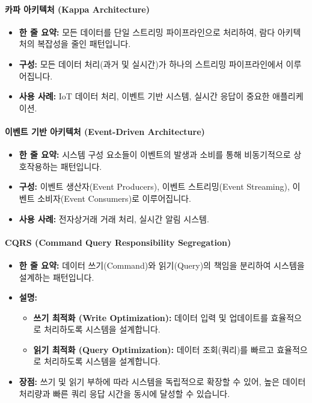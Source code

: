 \documentclass[11pt,a4paper]{article}
\theoremstyle{definition}
\begin{document}
\paragraph{카파 아키텍처 (Kappa Architecture)}
\begin{itemize}
    \item \textbf{한 줄 요약:} 모든 데이터를 단일 스트리밍 파이프라인으로 처리하여, 람다 아키텍처의 복잡성을 줄인 패턴입니다.
    \item \textbf{구성:} 모든 데이터 처리(과거 및 실시간)가 하나의 스트리밍 파이프라인에서 이루어집니다.
    \item \textbf{사용 사례:} IoT 데이터 처리, 이벤트 기반 시스템, 실시간 응답이 중요한 애플리케이션.
\end{itemize}

\paragraph{이벤트 기반 아키텍처 (Event-Driven Architecture)}
\begin{itemize}
    \item \textbf{한 줄 요약:} 시스템 구성 요소들이 이벤트의 발생과 소비를 통해 비동기적으로 상호작용하는 패턴입니다.
    \item \textbf{구성:} 이벤트 생산자(Event Producers), 이벤트 스트리밍(Event Streaming), 이벤트 소비자(Event Consumers)로 이루어집니다.
    \item \textbf{사용 사례:} 전자상거래 거래 처리, 실시간 알림 시스템.
\end{itemize}

\paragraph{CQRS (Command Query Responsibility Segregation)}
\begin{itemize}
    \item \textbf{한 줄 요약:} 데이터 쓰기(Command)와 읽기(Query)의 책임을 분리하여 시스템을 설계하는 패턴입니다.
    \item \textbf{설명:}
    \begin{itemize}
        \item \textbf{쓰기 최적화 (Write Optimization):} 데이터 입력 및 업데이트를 효율적으로 처리하도록 시스템을 설계합니다.
        \item \textbf{읽기 최적화 (Query Optimization):} 데이터 조회(쿼리)를 빠르고 효율적으로 처리하도록 시스템을 설계합니다.
    \end{itemize}
    \item \textbf{장점:} 쓰기 및 읽기 부하에 따라 시스템을 독립적으로 확장할 수 있어, 높은 데이터 처리량과 빠른 쿼리 응답 시간을 동시에 달성할 수 있습니다.
\end{itemize}
\end{document}

